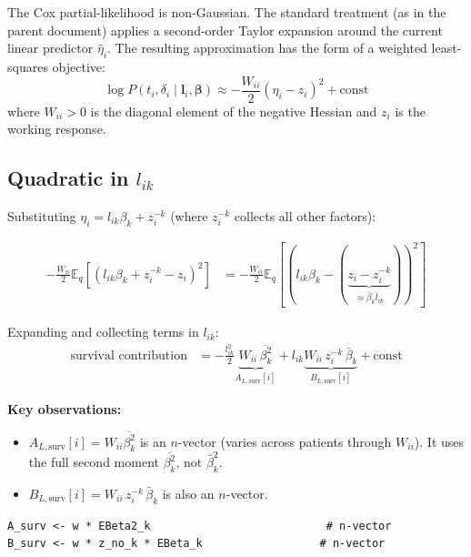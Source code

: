 \documentclass[11pt]{article}
\newcommand{\lbar}[2]{\bar{l}_{#1#2}}
\newcommand{\betabar}[1]{\bar{\beta}_{#1}}
\newcommand{\betasec}[1]{\overline{\beta^2_{#1}}}
\newcommand{\zk}[0]{z^{-k}}
\begin{document}
The Cox partial-likelihood is non-Gaussian.  The standard treatment (as in
the parent document) applies a second-order Taylor expansion around the
current linear predictor $\hat{\eta}_i$.  The resulting approximation has
the form of a weighted least-squares objective:
\begin{equation}
  \log P(t_i, \delta_i \mid \bm{l}_i, \bm{\beta})
  \approx -\frac{W_{ii}}{2}(\eta_i - z_i)^2 + \text{const}
  \label{eq:cox-taylor}
\end{equation}
where $W_{ii} > 0$ is the diagonal element of the negative Hessian and
$z_i$ is the working response.

\subsection{Quadratic in $l_{ik}$}

Substituting $\eta_i = l_{ik}\beta_k + \zk_i$ (where $\zk_i$ collects all
other factors):

\begin{derivbox}
\begin{align*}
  -\frac{W_{ii}}{2}\mathbb{E}_q\!\left[(l_{ik}\beta_k + \zk_i - z_i)^2\right]
  &= -\frac{W_{ii}}{2}\mathbb{E}_q\!\left[(l_{ik}\beta_k - (\underbrace{z_i - \zk_i}_{\approx\betabar{k}\lbar{i}{k}}))^2\right]
\end{align*}

Expanding and collecting terms in $l_{ik}$:
\begin{align}
  \text{survival contribution}
  &= -\frac{l_{ik}^2}{2}\underbrace{W_{ii}\,\betasec{k}}_{A_{L,\text{surv}}[i]}
     + l_{ik}\underbrace{W_{ii}\,\zk_i\,\betabar{k}}_{B_{L,\text{surv}}[i]}
     + \text{const}
  \label{eq:survival-AB}
\end{align}
\end{derivbox}

\textbf{Key observations:}
\begin{itemize}
  \item $A_{L,\text{surv}}[i] = W_{ii}\betasec{k}$ is an $n$-vector (varies
    across patients through $W_{ii}$).  It uses the full second moment
    $\overline{\beta_k^2}$, not $\bar{\beta}_k^2$.
  \item $B_{L,\text{surv}}[i] = W_{ii}\,\zk_i\,\betabar{k}$ is also an
    $n$-vector.
\end{itemize}

\begin{codebox}
\begin{verbatim}
A_surv <- w * EBeta2_k                           # n-vector
B_surv <- w * z_no_k * EBeta_k                  # n-vector
\end{verbatim}
\end{codebox}
\end{document}
